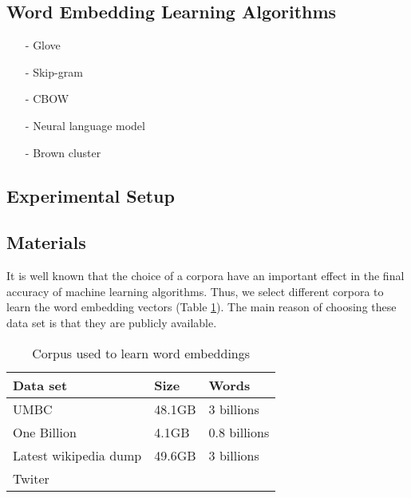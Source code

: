 \documentclass[11pt]{article}
\begin{document}
\subsection{Word Embedding Learning Algorithms}
\begin{itemize}
\item[-] Glove \cite{pennington2014glove}
\item[-] Skip-gram \cite{Mikolov13}
\item[-] CBOW \cite{Mikolov13}
\item[-] Neural language model \cite{Turian10wordrepresentations}
\item[-] Brown cluster \cite{Brown92class-basedn-gram}
\end{itemize}





\subsection{Experimental Setup}

\subsection{Materials}
It is well known that the choice of a corpora have an important effect in the final accuracy of machine learning algorithms. 
Thus, we select different corpora to learn the word embedding vectors (Table \ref{corpus}).
The main reason of choosing these data set is that they are publicly available. 


\begin{table}[h]
\begin{center}
\begin{small}
\begin{tabular}{lll}
\hline
\textbf{Data set} & \textbf{Size} & \textbf{Words} \\ \hline
UMBC 	& 48.1GB & 3 billions \\
One Billion 	& 4.1GB & 0.8 billions  \\
Latest wikipedia dump & 49.6GB & 3 billions \\
Twiter & &  \\ \hline
\end{tabular}
\end{small}
\label{corpus}
\caption{Corpus used to learn word embeddings}
\end{center}
\end{table}
\end{document}
